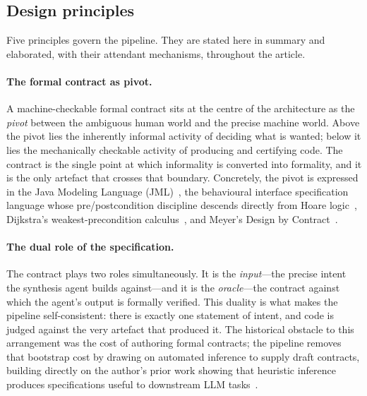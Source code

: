 \subsection{Design principles}
\label{subsec:principles}

Five principles govern the pipeline. They are stated here in summary and elaborated, with their attendant mechanisms, throughout the article.

\paragraph{The formal contract as pivot.}
A machine-checkable formal contract sits at the centre of the architecture as the \emph{pivot} between the ambiguous human world and the precise machine world. Above the pivot lies the inherently informal activity of deciding what is wanted; below it lies the mechanically checkable activity of producing and certifying code. The contract is the single point at which informality is converted into formality, and it is the only artefact that crosses that boundary. Concretely, the pivot is expressed in the Java Modeling Language (JML)~\cite{leavens2006jml}, the behavioural interface specification language whose pre/postcondition discipline descends directly from Hoare logic~\cite{hoare1969axiomatic}, Dijkstra's weakest-precondition calculus~\cite{dijkstra1976discipline}, and Meyer's Design by Contract~\cite{meyer1992dbc}.

\paragraph{The dual role of the specification.}
The contract plays two roles simultaneously. It is the \emph{input}---the precise intent the synthesis agent builds against---and it is the \emph{oracle}---the contract against which the agent's output is formally verified. This duality is what makes the pipeline self-consistent: there is exactly one statement of intent, and code is judged against the very artefact that produced it. The historical obstacle to this arrangement was the cost of authoring formal contracts; the pipeline removes that bootstrap cost by drawing on automated inference to supply draft contracts, building directly on the author's prior work showing that heuristic inference produces specifications useful to downstream LLM tasks~\cite{edmonds_article1,edmonds_article3}.

